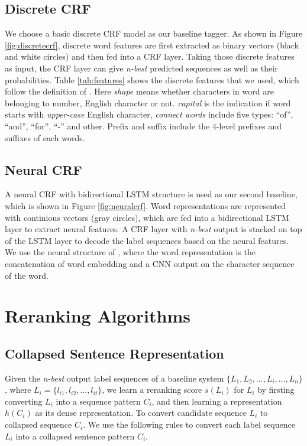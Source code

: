 \documentclass[11pt,a4paper]{article}
\begin{document}
\subsection{Discrete CRF}
We choose a basic discrete CRF model as our baseline tagger. As shown in Figure \ref{fig:discretecrf}, discrete word features are first extracted as binary vectors (black and white circles) and then fed into a CRF layer. Taking those discrete features as input, the CRF layer can give \textit{n-best} predicted sequences as well as their probabilities. Table \ref{tab:features} shows the discrete features that we used, which follow the definition of \cite{Jie2016combining}. Here \textit{shape} means whether characters in word are belonging to number, English character or not. \textit{capital} is the indication if word starts with \textit{upper-case} English character, \textit{connect words} include  five types: ``of'', ``and'', ``for'', ``-'' and other. Prefix and suffix include the 4-level prefixes and suffixes of each words.

\subsection{Neural CRF}
A neural CRF with bidirectional LSTM structure is used as our second baseline, which is shown in Figure \ref{fig:neuralcrf}.  Word representations are represented with continious vectors (gray circles), which are fed into a bidirectional LSTM layer to extract neural features. A CRF layer with \textit{n-best} output is stacked on top of the LSTM layer to decode the label sequences based on the neural features. We use the neural structure of \citet{ma2016end}, where the word representation is the concatenation of word embedding and a CNN output on the character sequence of the word.

\section{Reranking Algorithms}
\subsection{Collapsed Sentence Representation}\label{rule}
Given the \textit{n-best} output label sequences of a baseline system $\{L_1,L_2,...,L_i,...,L_n\}$, where $L_i = \{l_{i1},l_{i2},...,l_{it}\}$, we learn a reranking score $s(L_i)$ for $L_i$ by firsting converting $L_i$ into a sequence pattern $C_i$, and then learning a representation $h(C_i)$ as its dense representation. To convert candidate sequence $L_i$ to collapsed sequence $C_i$. We use the following rules to convert each label sequence $L_i$ into a collapsed sentence pattern $C_i$. 
\end{document}
